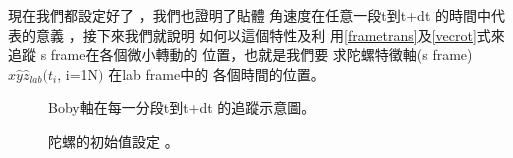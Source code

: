 \documentclass[12pt,a4paper]{article}
\begin{document}
現在我們都設定好了%
，我們也證明了貼體%
角速度在任意一段t到t+dt%
的時間中代表的意義%
，接下來我們就說明%
如何以這個特性及利%
用\ref{frametrans}及\ref{vecrot}式來追蹤%
s frame在各個微小轉動的%
位置，也就是我們要%
求陀螺特徵軸(s frame) $\hat{x}\hat{y}%
\hat{z}_{lab}(t_{i}$, i=1N$)$ 在lab frame中的%
各個時間的位置。\bigskip

\begin{figure}[th]
\caption{Boby軸在每一分段t到t+dt%
的追蹤示意圖。}
\begin{center}
\fbox{}
\end{center}
\end{figure}

\begin{figure}[th]
\caption{陀螺的初始值設定%
。}
\begin{center}
\fbox{}
\end{center}
\end{figure}
\end{document}
